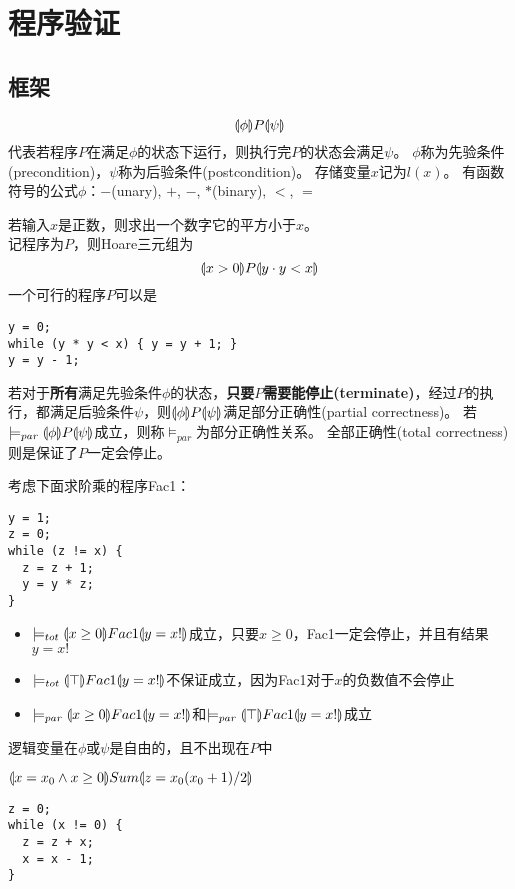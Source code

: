 
\section{程序验证}
\subsection{框架}
\begin{definition}
\[\llparenthesis \phi\rrparenthesis P\llparenthesis \psi\rrparenthesis\]
代表若程序$P$在满足$\phi$的状态下运行，则执行完$P$的状态会满足$\psi$。
$\phi$称为先验条件(precondition)，$\psi$称为后验条件(postcondition)。
存储变量$x$记为$l(x)$。
有函数符号的公式$\phi$：$-$(unary), $+$, $-$, $*$(binary), $<$, $=$
\end{definition}
\begin{example}
若输入$x$是正数，则求出一个数字它的平方小于$x$。\\
记程序为$P$，则Hoare三元组为
\[\llparenthesis x>0\rrparenthesis P\llparenthesis y\cdot y<x\rrparenthesis\]
一个可行的程序$P$可以是
\begin{lstlisting}
y = 0;
while (y * y < x) { y = y + 1; }
y = y - 1;
\end{lstlisting}
\end{example}
\begin{definition}[正确性]
若对于\textbf{所有}满足先验条件$\phi$的状态，\textbf{只要$P$需要能停止(terminate)}，经过$P$的执行，都满足后验条件$\psi$，则$\llparenthesis \phi\rrparenthesis P\llparenthesis \psi\rrparenthesis$满足部分正确性(partial correctness)。
若$\models_{par}\llparenthesis \phi\rrparenthesis P\llparenthesis \psi\rrparenthesis$成立，则称$\models_{par}$为部分正确性关系。
全部正确性(total correctness)则是保证了$P$一定会停止。
\end{definition}
\begin{example}
考虑下面求阶乘的程序Fac1：
\begin{lstlisting}
y = 1;
z = 0;
while (z != x) {
  z = z + 1;
  y = y * z;
}
\end{lstlisting}
\begin{itemize}
\item $\models_{tot}\llparenthesis x \geq 0 \rrparenthesis Fac1\llparenthesis y = x! \rrparenthesis$成立，只要$x \geq 0$，Fac1一定会停止，并且有结果$y = x!$
\item $\models_{tot}\llparenthesis \top \rrparenthesis Fac1\llparenthesis y = x! \rrparenthesis$不保证成立，因为Fac1对于$x$的负数值不会停止
\item $\models_{par}\llparenthesis x \geq 0 \rrparenthesis Fac1\llparenthesis y = x! \rrparenthesis$和$\models_{par}\llparenthesis \top\rrparenthesis Fac1\llparenthesis y = x!\rrparenthesis$成立
\end{itemize}
\end{example}
\begin{definition}
逻辑变量在$\phi$或$\psi$是自由的，且不出现在$P$中
\end{definition}
\begin{example}
$\llparenthesis x=x_0\land x\geq 0\rrparenthesis Sum\llparenthesis z=x_0(x_0+1)/2\rrparenthesis$
\begin{lstlisting}
z = 0;
while (x != 0) {
  z = z + x;
  x = x - 1;
}
\end{lstlisting}
\end{example}

